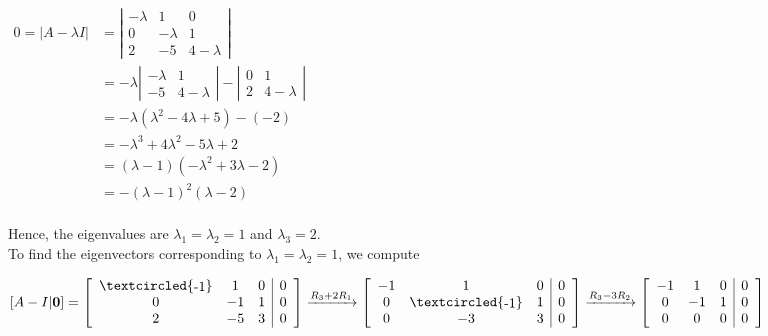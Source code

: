 \documentclass[
  letterpaper,
  DIV=11,
  numbers=noendperiod]{scrartcl}
\theoremstyle{remark}
\begin{document}
\(\begin{alignedat}{2}
        0 = |A - \lambda I| &= \left|\begin{array}{ccc}
            -\lambda & 1 & 0 \\
            0 & -\lambda & 1 \\
            2 & -5 & 4-\lambda
        \end{array}\right| \\
        {} &= -\lambda \left|\begin{array}{cc} -\lambda & 1 \\ -5 & 4-\lambda \end{array}\right| -  \left|\begin{array}{cc} 0 & 1 \\ 2 & 4-\lambda \end{array}\right| \\
        {} &= -\lambda (\lambda ^2-4\lambda +5)-(-2) \\
        {} &= -\lambda ^3 + 4\lambda ^2 - 5\lambda + 2 \\
        {} &= (\lambda -1)(-\lambda ^2 + 3\lambda - 2) \\
        {} &= -(\lambda -1)^2(\lambda -2) \\
    \end{alignedat}\)

Hence, the eigenvalues are \(\lambda _{1} = \lambda _{2} = 1\) and
\(\lambda _{3} = 2\).\\
To find the eigenvectors corresponding to
\(\lambda _{1} = \lambda _{2} = 1\), we compute

\(\left[A - I | \mathbf{0}\right] = \left[\begin{array}{ccc | c} \textcircled{\raisebox{-0.9pt}{-1}} & 1 & 0 & 0 \\ 0 & -1 & 1 & 0 \\ 2 & -5 & 3 & 0 \end{array}\right] \xrightarrow{R_{3} + 2R_{1}} \left[\begin{array}{ccc | c} -1 & 1 & 0 & 0 \\ 0 & \textcircled{\raisebox{-0.9pt}{-1}} & 1 & 0 \\ 0 & -3 & 3 & 0 \end{array}\right] \xrightarrow{R_{3} - 3R_{2}} \left[\begin{array}{ccc | c} -1 & 1 & 0 & 0 \\ 0 & -1 & 1 & 0 \\ 0 & 0 & 0 & 0 \end{array}\right]\)
\end{document}
